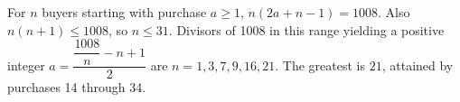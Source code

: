 For $n$ buyers starting with purchase $a\ge1$, $n(2a+n-1)=1008$. Also $n(n+1)\le1008$, so $n\le31$. Divisors of 1008 in this range yielding a positive integer $a=\dfrac{\dfrac{1008}{n}-n+1}{2}$ are $n=1,3,7,9,16,21$. The greatest is $\boxed{21}$, attained by purchases 14 through 34.
